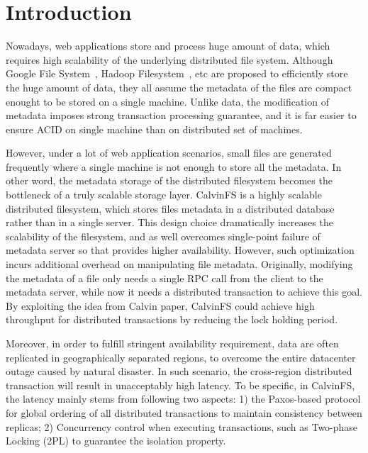 \section{Introduction}

Nowadays, web applications store and process huge amount of data, which requires high scalability of the underlying distributed file system. Although Google File System~\cite{gfs}, Hadoop Filesystem~\cite{hdfs}, etc are proposed to efficiently store the huge amount of data, they all assume the metadata of the files are compact enought to be stored on a single machine. Unlike data, the modification of metadata imposes strong transaction processing guarantee, and it is far easier to ensure ACID on single machine than on distributed set of machines.

However, under a lot of web application scenarios, small files are generated frequently where a single machine is not enough to store all the metadata. In other word, the metadata storage of the distributed filesystem becomes the bottleneck of a truly scalable storage layer. CalvinFS is a highly scalable distributed filesystem, which stores files metadata in a distributed database rather than in a single server. This design choice dramatically increases the scalability of the filesystem, and as well overcomes single-point failure of metadata server so that provides higher availability. However, such optimization incurs additional overhead on manipulating file metadata. Originally, modifying the metadata of a file only needs a single RPC call from the client to the metadata server, while now it needs a distributed transaction to achieve this goal. By exploiting the idea from Calvin paper, CalvinFS could achieve high throughput for distributed transactions by reducing the lock holding period.

Moreover, in order to fulfill stringent availability requirement, data are often replicated in geographically separated regions, to overcome the entire datacenter outage caused by natural disaster. In such scenario, the cross-region distributed transaction will result in unacceptably high latency. To be specific, in CalvinFS, the latency mainly stems from following two aspects: 1) the Paxos-based protocol for global ordering of all distributed transactions to maintain consistency between replicas; 2) Concurrency control when executing transactions, such as Two-phase Locking (2PL) to guarantee the isolation property.

